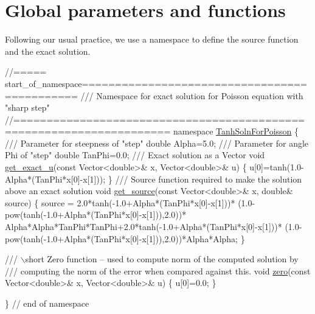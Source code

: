 \hypertarget{index_global}{}\section{Global parameters and functions}\label{index_global}
Following our usual practice, we use a namespace to define the source function and the exact solution.  
\begin{DoxyCodeInclude}
\textcolor{comment}{//===== start\_of\_namespace=============================================}
\textcolor{comment}{/// Namespace for exact solution for Poisson equation with "sharp step" }
\textcolor{comment}{}\textcolor{comment}{//=====================================================================}
\textcolor{keyword}{namespace }\hyperlink{namespaceTanhSolnForPoisson}{TanhSolnForPoisson}
\{
\textcolor{comment}{}
\textcolor{comment}{ /// Parameter for steepness of "step"}
\textcolor{comment}{} \textcolor{keywordtype}{double} Alpha=5.0;
\textcolor{comment}{}
\textcolor{comment}{ /// Parameter for angle Phi of "step"}
\textcolor{comment}{} \textcolor{keywordtype}{double} TanPhi=0.0;
\textcolor{comment}{}
\textcolor{comment}{ /// Exact solution as a Vector}
\textcolor{comment}{} \textcolor{keywordtype}{void} \hyperlink{namespaceTanhSolnForPoisson_af7896e9c18ce6438c73ae2a875e8b7de}{get\_exact\_u}(\textcolor{keyword}{const} Vector<double>& x, Vector<double>& u)
 \{
  u[0]=tanh(1.0-Alpha*(TanPhi*x[0]-x[1]));
 \}
\textcolor{comment}{}
\textcolor{comment}{ /// Source function required to make the solution above an exact solution }
\textcolor{comment}{} \textcolor{keywordtype}{void} \hyperlink{namespaceTanhSolnForPoisson_ae1b9d6789ff301e3d63a4e292213036c}{get\_source}(\textcolor{keyword}{const} Vector<double>& x, \textcolor{keywordtype}{double}& source)
 \{
  source = 2.0*tanh(-1.0+Alpha*(TanPhi*x[0]-x[1]))*
   (1.0-pow(tanh(-1.0+Alpha*(TanPhi*x[0]-x[1])),2.0))*
   Alpha*Alpha*TanPhi*TanPhi+2.0*tanh(-1.0+Alpha*(TanPhi*x[0]-x[1]))*
   (1.0-pow(tanh(-1.0+Alpha*(TanPhi*x[0]-x[1])),2.0))*Alpha*Alpha;
 \}
 
\textcolor{comment}{}
\textcolor{comment}{ /// \(\backslash\)short Zero function -- used to compute norm of the computed solution by }
\textcolor{comment}{ /// computing the norm of the error when compared against this.}
\textcolor{comment}{} \textcolor{keywordtype}{void} \hyperlink{namespaceTanhSolnForPoisson_a5cd8441c6e87d4bc153697eff13513dd}{zero}(\textcolor{keyword}{const} Vector<double>& x, Vector<double>& u)
 \{
  u[0]=0.0;
 \}

\} \textcolor{comment}{// end of namespace}

\end{DoxyCodeInclude}





